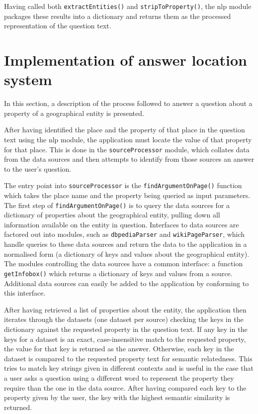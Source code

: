 \documentclass[authoryearcitations]{UoYCSproject}
\begin{document}
Having called both \texttt{extractEntities()} and \texttt{stripToProperty()}, the nlp module packages these results into a dictionary and returns them as the processed representation of the question text.

\section{Implementation of answer location system}
In this section, a description of the process followed to answer a question about a property of a geographical entity is presented. 

After having identified the place and the property of that place in the question text using the nlp module, the application must locate the value of that property for that place. This is done in the \texttt{sourceProcessor} module, which collates data from the data sources and then attempts to identify from those sources an answer to the user's question.

The entry point into \texttt{sourceProcessor} is the \texttt{findArgumentOnPage()} function which takes the place name and the property being queried as input parameters. The first step of \texttt{findArgumentOnPage()} is to query the data sources for a dictionary of properties about the geographical entity, pulling down all information available on the entity in question. Interfaces to data sources are factored out into modules, such as \texttt{dbpediaParser} and \texttt{wikiPageParser}, which handle queries to these data sources and return the data to the application in a normalised form (a dictionary of keys and values about the geographical entity). The modules controlling the data sources have a common interface: a function \texttt{getInfobox()} which returns a dictionary of keys and values from a source. Additional data sources can easily be added to the application by conforming to this interface.

After having retrieved a list of properties about the entity, the application then iterates through the datasets (one dataset per source) checking the keys in the dictionary against the requested property in the question text. If any key in the keys for a dataset is an exact, case-insensitive match to the requested property, the value for that key is returned as the answer. Otherwise, each key in the dataset is compared to the requested property text for semantic relatedness. This tries to match key strings given in different contexts and is useful in the case that a user asks a question using a different word to represent the property they require than the one in the data source. After having compared each key to the property given by the user, the key with the highest semantic similarity is returned. 
\end{document}
